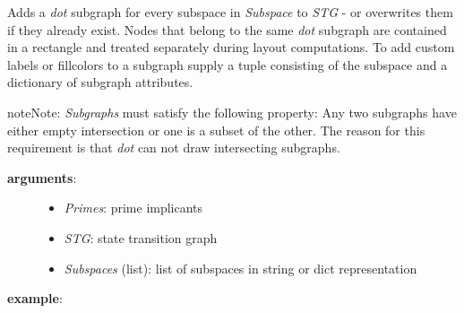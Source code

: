 \documentclass[letterpaper,10pt,english]{sphinxmanual}
\begin{document}
\begin{fulllineitems}
\label{StateTransitionGraphs:PyBoolNet.StateTransitionGraphs.add_style_subspaces}
Adds a \emph{dot} subgraph for every subspace in \emph{Subspace} to \emph{STG} - or overwrites them if they already exist.
Nodes that belong to the same \emph{dot} subgraph are contained in a rectangle and treated separately during layout computations.
To add custom labels or fillcolors to a subgraph supply a tuple consisting of the
subspace and a dictionary of subgraph attributes.

\begin{notice}{note}{Note:}
\emph{Subgraphs} must satisfy the following property:
Any two subgraphs have either empty intersection or one is a subset of the other.
The reason for this requirement is that \emph{dot} can not draw intersecting subgraphs.
\end{notice}
\begin{description}
\item[{\textbf{arguments}:}] \leavevmode\begin{itemize}
\item {} 
\emph{Primes}: prime implicants

\item {} 
\emph{STG}: state transition graph

\item {} 
\emph{Subspaces} (list): list of subspaces in string or dict representation

\end{itemize}

\end{description}

\textbf{example}:


\end{fulllineitems}
\end{document}
